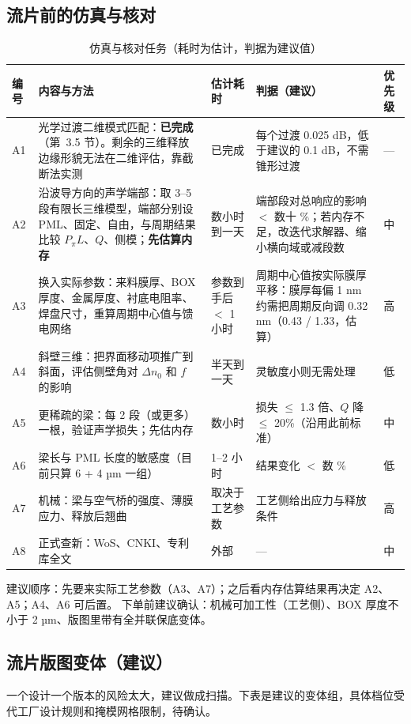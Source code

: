 \documentclass[10pt,a4paper]{article}
\newcommand{\dn}{\Delta n_0}
\begin{document}
\subsection{流片前的仿真与核对}
\begin{table}[H]
\centering\footnotesize
\caption{仿真与核对任务（耗时为估计，判据为建议值）}
\begin{tabular}{L{0.8cm}L{5.6cm}L{2.0cm}L{4.4cm}L{1.2cm}}
\toprule
编号 & 内容与方法 & 估计耗时 & 判据（建议） & 优先级 \\
\midrule
A1 & 光学过渡二维模式匹配：\textbf{已完成}（第~3.5 节）。剩余的三维释放边缘形貌无法在二维评估，靠截断法实测 & 已完成 & 每个过渡 0.025 dB，低于建议的 0.1 dB，不需锥形过渡 & --- \\
A2 & 沿波导方向的声学端部：取 3--5 段有限长三维模型，端部分别设 PML、固定、自由，与周期结果比较 $P_\pi L$、$Q$、侧模；\textbf{先估算内存} & 数小时到一天 & 端部段对总响应的影响 $<$ 数十 \%；若内存不足，改迭代求解器、缩小横向域或减段数 & 中 \\
A3 & 换入实际参数：来料膜厚、BOX 厚度、金属厚度、衬底电阻率、焊盘尺寸，重算周期中心值与馈电网络 & 参数到手后 $<$ 1 小时 & 周期中心值按实际膜厚平移：膜厚每偏 1 nm 约需把周期反向调 0.32 nm（0.43 / 1.33，估算） & 高 \\
A4 & 斜壁三维：把界面移动项推广到斜面，评估侧壁角对 $\dn$ 和 $f$ 的影响 & 半天到一天 & 灵敏度小则无需处理 & 低 \\
A5 & 更稀疏的梁：每 2 段（或更多）一根，验证声学损失；先估内存 & 数小时 & 损失 $\le$ 1.3 倍、$Q$ 降 $\le$ 20\%（沿用此前标准） & 中 \\
A6 & 梁长与 PML 长度的敏感度（目前只算 6 + 4 µm 一组） & 1--2 小时 & 结果变化 $<$ 数 \% & 低 \\
A7 & 机械：梁与空气桥的强度、薄膜应力、释放后翘曲 & 取决于工艺参数 & 工艺侧给出应力与释放条件 & 高 \\
A8 & 正式查新：WoS、CNKI、专利库全文 & 外部 & --- & 中 \\
\bottomrule
\end{tabular}
\end{table}

\noindent 建议顺序：先要来实际工艺参数（A3、A7）；之后看内存估算结果再决定 A2、A5；A4、A6 可后置。
下单前建议确认：机械可加工性（工艺侧）、BOX 厚度不小于 2 µm、版图里带有全并联保底变体。

\subsection{流片版图变体（建议）}
一个设计一个版本的风险太大，建议做成扫描。下表是建议的变体组，具体档位受代工厂设计规则和掩模网格限制，待确认。
\end{document}
